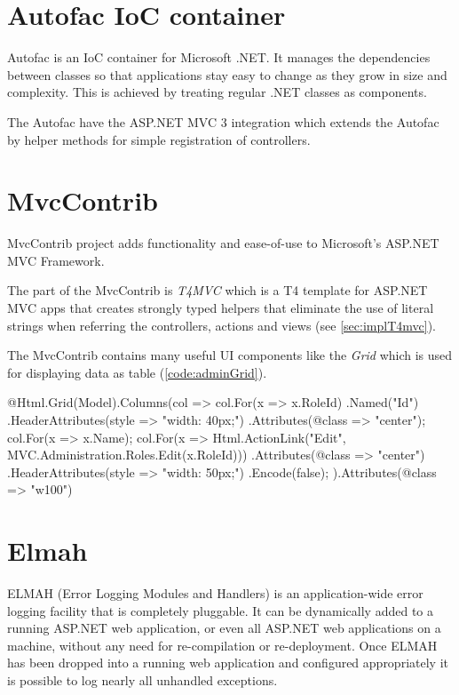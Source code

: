 \section{Autofac IoC container}
\label{sec:autofac}

\noindent
Autofac is an IoC container for Microsoft .NET.
It manages the dependencies between classes so that applications stay easy to change as they grow in size and complexity.
This is achieved by treating regular .NET classes as components.

The Autofac have the ASP.NET MVC 3 integration which extends the Autofac by helper methods for simple registration of controllers.


\section{MvcContrib}
\label{sec:mvcContrib}

\noindent
MvcContrib project adds functionality and ease-of-use to Microsoft's ASP.NET MVC Framework.

The part of the MvcContrib is \emph{T4MVC} which is a T4 template for ASP.NET MVC apps that creates strongly typed helpers that eliminate the use of literal strings when referring the controllers, actions and views (see \autoref{sec:implT4mvc}).

The MvcContrib contains many useful UI components like the \emph{Grid} which is used for displaying data as table (\autoref{code:adminGrid}).

\begin{Razor}[label=code:adminGrid,caption={Usage of the \emph{Grid} component to show list of user roles}]
@Html.Grid(Model).Columns(col => {
		col.For(x => x.RoleId)
			.Named("Id")
			.HeaderAttributes(style => "width: 40px;")
			.Attributes(@class => "center");
		col.For(x => x.Name);
		col.For(x => Html.ActionLink("Edit", MVC.Administration.Roles.Edit(x.RoleId)))
			.Attributes(@class => "center")
			.HeaderAttributes(style => "width: 50px;")
			.Encode(false);
	}).Attributes(@class => "w100")
\end{Razor} 


\section{Elmah}
\label{sec:elmah}

\noindent
ELMAH (Error Logging Modules and Handlers) is an application-wide error logging facility that is completely pluggable.
It can be dynamically added to a running ASP.NET web application, or even all ASP.NET web applications on a machine, without any need for re-compilation or re-deployment.
Once ELMAH has been dropped into a running web application and configured appropriately it is possible to log nearly all unhandled exceptions.


